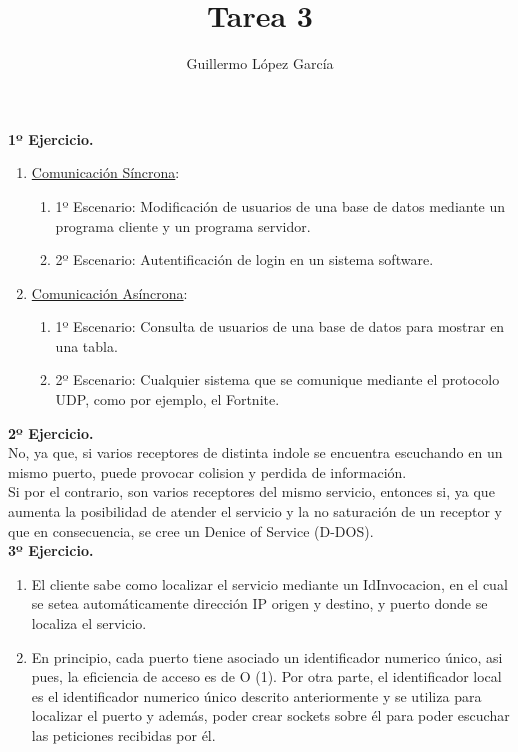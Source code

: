 \documentclass{article}
\title{Tarea 3}
\author{Guillermo López García}
\begin{document}
\textbf{1º Ejercicio.}
\begin{enumerate}
    \item \underline{Comunicación Síncrona}:
        \begin{enumerate}
            \item 1º Escenario: Modificación de usuarios de una base de datos mediante un programa cliente y un programa servidor.
            \item 2º Escenario: Autentificación de login en un sistema software.
        \end{enumerate}
    \item \underline{Comunicación Asíncrona}:
        \begin{enumerate}
            \item 1º Escenario: Consulta de usuarios de una base de datos para mostrar en una tabla.
            \item 2º Escenario: Cualquier sistema que se comunique mediante el protocolo UDP, como por ejemplo, el Fortnite.
        \end{enumerate}
\end{enumerate}

\textbf{2º Ejercicio.}
\\
No, ya que, si varios receptores de distinta indole se encuentra escuchando en un mismo
puerto, puede provocar colision y perdida de información.\\
Si por el contrario, son varios receptores del mismo servicio, entonces si, ya que aumenta
la posibilidad de atender el servicio y la no saturación de un receptor y que en consecuencia,
se cree un Denice of Service (D-DOS).\\

\textbf{3º Ejercicio.}
\begin{enumerate}
    \item El cliente sabe como localizar el servicio mediante un IdInvocacion, en el cual se
          setea automáticamente dirección IP origen y destino, y puerto donde se localiza el
          servicio.
    \item En principio, cada puerto tiene asociado un identificador numerico único, asi pues,
          la eficiencia de acceso es de O (1). Por otra parte, el identificador local es el
          identificador numerico único descrito anteriormente y se utiliza para localizar el
          puerto y además, poder crear sockets sobre él para poder escuchar las peticiones
          recibidas por él.
\end{enumerate}
\end{document}
